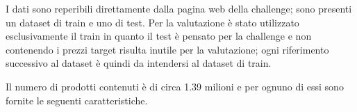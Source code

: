 
I dati sono reperibili direttamente dalla pagina web della challenge; sono
presenti un dataset di train e uno di test. Per la valutazione è stato utilizzato
esclusivamente il train in quanto il test è pensato per la
challenge e non contenendo i prezzi target risulta inutile per la valutazione;
ogni riferimento successivo al dataset è quindi da intendersi al dataset di train.

Il numero di prodotti contenuti è di circa 1.39 milioni e per ognuno di essi
sono fornite le seguenti caratteristiche.

